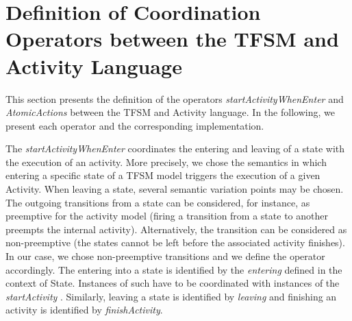 \section{Definition of Coordination Operators between the TFSM and Activity Language}
This section presents the definition of the operators \emph{startActivityWhenEnter} and \emph{AtomicActions} between the TFSM and Activity language. In the following, we present each operator and the corresponding \bcool implementation. 

The \emph{startActivityWhenEnter} coordinates the entering and leaving of a state with the execution of an activity. More precisely, we chose the semantics in which entering a specific state of a TFSM model triggers the execution of a given Activity. When leaving a state, several semantic variation points may be chosen. The outgoing transitions from a state can be considered, for instance, as preemptive for the activity model (\ie firing a transition from a state to another preempts the internal activity). Alternatively, the transition can be considered as non-preemptive (\ie the states cannot be left before the associated activity finishes). In our case, we chose non-preemptive transitions and we define the operator accordingly. The entering into a state is identified by the \textit{entering} \dse defined in the context of State. Instances of such \dse have to be coordinated with instances of the \textit{startActivity} \dse. Similarly, leaving a state is identified by \dse \textit{leaving} and finishing an activity is identified by \dse \textit{finishActivity}. 


